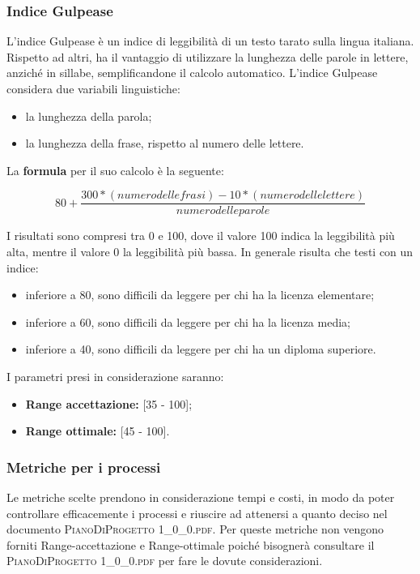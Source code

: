 		\subsubsection{Indice Gulpease}
		L'indice Gulpease è un indice di leggibilità di un testo tarato sulla lingua italiana. Rispetto ad altri, ha il vantaggio di utilizzare la lunghezza delle parole in lettere, anziché in sillabe, semplificandone il calcolo automatico. L'indice Gulpease considera due variabili linguistiche:
		\begin{itemize}
			\item la lunghezza della parola;
			\item la lunghezza della frase, rispetto al numero delle lettere.
		\end{itemize}
		La \textbf{formula} per il suo calcolo è la seguente:
		
		\[ 80+\frac{300*(numero delle frasi)-10*(numero delle lettere)}{numero delle parole} \]
		
		I risultati sono compresi tra 0 e 100, dove il valore 100 indica la leggibilità più alta, mentre il valore 0 la leggibilità più bassa. In generale risulta che testi con un indice:
		\begin{itemize}
			\item inferiore a 80, sono difficili da leggere per chi ha la licenza elementare;
			\item inferiore a 60, sono difficili da leggere per chi ha la licenza media;
			\item inferiore a 40, sono difficili da leggere per chi ha un diploma superiore.
		\end{itemize}
		
		I parametri presi in considerazione saranno:
		\begin{itemize}
			\item \textbf{Range accettazione: }[35 - 100];
			\item \textbf{Range ottimale: }[45 - 100].
		\end{itemize}
		
		\subsubsection{Metriche per i processi}
		Le metriche scelte prendono in considerazione tempi e costi, in modo da poter controllare efficacemente i processi e riuscire ad attenersi a quanto deciso nel documento \textsc{PianoDiProgetto 1\_0\_0.pdf}. 
		Per queste metriche non vengono forniti Range-accettazione e Range-ottimale poiché bisognerà consultare il \textsc{PianoDiProgetto 1\_0\_0.pdf} per fare le dovute considerazioni.
		
